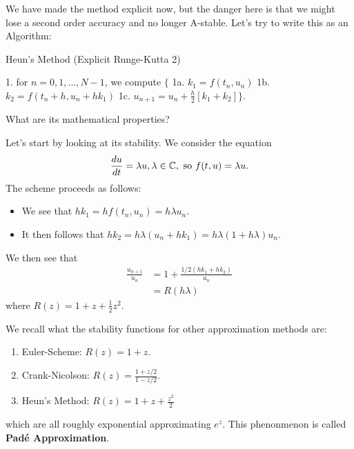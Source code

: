 \documentclass{article}
\begin{document}
We have made the method explicit now, but the danger here is that we might lose a second order accuracy and no longer A-stable. Let's try to write this as an Algorithm:
\begin{tcolorbox}[standard jigsaw,opacityback=0]
\begin{algorithm}[H]
\caption{Heun's Method (Explicit Runge-Kutta 2)}
1. for $n = 0, 1, ..., N-1$, we compute $\{$\;
1a. $k_1 = f(t_n, u_n)$\;
1b. $k_2 = f(t_n +h, u_n + h k_1)$\;
1c. $u_{n+1} = u_n + \frac{h}{2} [k_1 + k_2]$$\}$. 
\end{algorithm}
\end{tcolorbox}

\begin{question}
    What are its mathematical properties?
\end{question}

Let's start by looking at its stability. We consider the equation
\[\frac{du}{dt} = \lambda u, \lambda \in \mathbb{C}, \text{ so } f(t, u) = \lambda u.\]
The scheme proceeds as follows:
\begin{itemize}
    \item We see that $h k_1 = h f(t_n, u_n) = h \lambda u_n$.
    \item It then follows that $h k_2 = h \lambda(u_n + h k_1) = h \lambda (1 + h \lambda ) u_n$.
\end{itemize}
We then see that
\begin{align*}
    \frac{u_{n+1}}{u_n} &= 1 + \frac{1/2(h k_1 + h k_2)}{u_n}\\
    &= R(h\lambda)
\end{align*}
where $R(z) = 1 + z + \frac{1}{2} z^2$.

\begin{remark}
We recall what the stability functions for other approximation methods are:
\begin{enumerate}
    \item Euler-Scheme: $R(z) = 1 + z$.
    \item Crank-Nicolson: $R(z) = \frac{1 + z/2}{1 - z/2}$.
    \item Heun's Method: $R(z) = 1 + z + \frac{z^2}{2}$
\end{enumerate}
which are all roughly exponential approximating $e^z$. This phenonmenon is called \textbf{Padé Approximation}. 
\end{remark}
\end{document}

